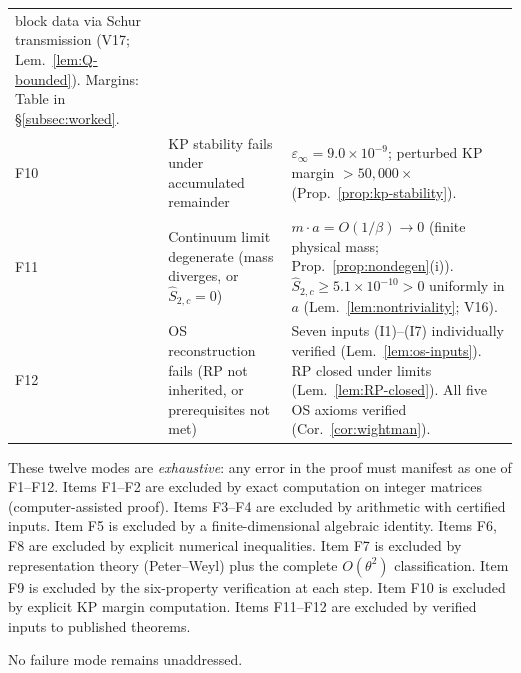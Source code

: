\documentclass[11pt]{article}
\theoremstyle{definition}
\begin{document}
\begin{center}
\begin{tabular}{@{}p{0.4cm}p{5.5cm}p{6.5cm}@{}}
block data via Schur transmission (V17;
Lem.~\ref{lem:Q-bounded}).
Margins: Table in \S\ref{subsec:worked}.\\
F10 & KP stability fails under accumulated remainder &
$\varepsilon_\infty=9.0\times 10^{-9}$; perturbed KP margin
$>50{,}000\times$ (Prop.~\ref{prop:kp-stability}).\\
F11 & Continuum limit degenerate
(mass diverges, or $\hat S_{2,c}=0$) &
$m\cdot a=O(1/\beta)\to 0$ (finite physical mass;
Prop.~\ref{prop:nondegen}(i)).
$\hat S_{2,c}\ge 5.1\times 10^{-10}>0$ uniformly in $a$
(Lem.~\ref{lem:nontriviality}; V16).\\
F12 & OS reconstruction fails
(RP not inherited, or prerequisites not met) &
Seven inputs (I1)--(I7) individually verified
(Lem.~\ref{lem:os-inputs}).
RP closed under limits (Lem.~\ref{lem:RP-closed}).
All five OS axioms verified (Cor.~\ref{cor:wightman}).\\
\bottomrule
\end{tabular}
\end{center}

\noindent
These twelve modes are \emph{exhaustive}: any error in the proof
must manifest as one of F1--F12.
Items F1--F2 are excluded by exact computation on
integer matrices (computer-assisted proof).
Items F3--F4 are excluded by arithmetic with certified inputs.
Item F5 is excluded by a finite-dimensional algebraic identity.
Items F6, F8 are excluded by explicit numerical inequalities.
Item F7 is excluded by representation theory (Peter--Weyl) plus
the complete $O(\theta^2)$ classification.
Item F9 is excluded by the six-property verification at each step.
Item F10 is excluded by explicit KP margin computation.
Items F11--F12 are excluded by verified inputs to published theorems.

No failure mode remains unaddressed.
\end{document}
